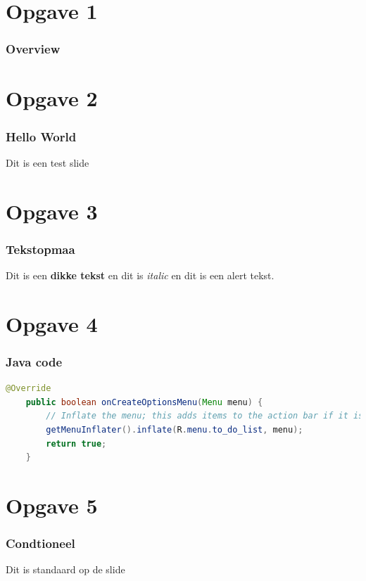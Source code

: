\documentclass{beamer}
\newif\ifanswers
\begin{document}
%

\section{Opgave 1}

\begin{frame}
	\frametitle{Overview}
	\tableofcontents[part=0,pausesections]
\end{frame}

\section{Opgave 2}
\begin{frame}
	\frametitle{Hello World}
		Dit is een test slide
\end{frame}

\section{Opgave 3}
\begin{frame}
	\frametitle{Tekstopmaa}
	Dit is een \textbf{dikke tekst} en dit is \textit{italic} en dit is \alert{een alert tekst.}
\end{frame}

\section{Opgave 4}
\begin{frame}[fragile]
	\frametitle{Java code}
	\begin{lstlisting}[language=java, ]
    @Override
    public boolean onCreateOptionsMenu(Menu menu) {
        // Inflate the menu; this adds items to the action bar if it is present.
        getMenuInflater().inflate(R.menu.to_do_list, menu);
        return true;
    }
	\end{lstlisting}
\end{frame}

\section{Opgave 5}
\begin{frame}
	\frametitle{Condtioneel}
		Dit is standaard op de slide
	\ifanswers
		Dit is enkel als answers op true staat
	\fi
\end{frame}
\end{document}
